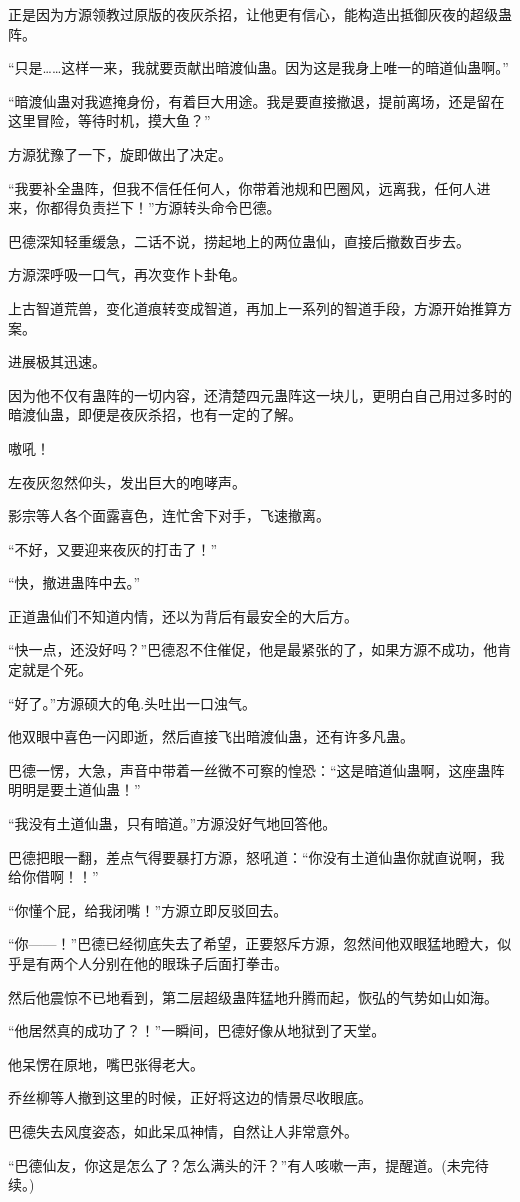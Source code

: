 \begin{this_body}
正是因为方源领教过原版的夜灰杀招，让他更有信心，能构造出抵御灰夜的超级蛊阵。

“只是……这样一来，我就要贡献出暗渡仙蛊。因为这是我身上唯一的暗道仙蛊啊。”

“暗渡仙蛊对我遮掩身份，有着巨大用途。我是要直接撤退，提前离场，还是留在这里冒险，等待时机，摸大鱼？”

方源犹豫了一下，旋即做出了决定。

“我要补全蛊阵，但我不信任任何人，你带着池规和巴圈风，远离我，任何人进来，你都得负责拦下！”方源转头命令巴德。

巴德深知轻重缓急，二话不说，捞起地上的两位蛊仙，直接后撤数百步去。

方源深呼吸一口气，再次变作卜卦龟。

上古智道荒兽，变化道痕转变成智道，再加上一系列的智道手段，方源开始推算方案。

进展极其迅速。

因为他不仅有蛊阵的一切内容，还清楚四元蛊阵这一块儿，更明白自己用过多时的暗渡仙蛊，即便是夜灰杀招，也有一定的了解。

嗷吼！

左夜灰忽然仰头，发出巨大的咆哮声。

影宗等人各个面露喜色，连忙舍下对手，飞速撤离。

“不好，又要迎来夜灰的打击了！”

“快，撤进蛊阵中去。”

正道蛊仙们不知道内情，还以为背后有最安全的大后方。

“快一点，还没好吗？”巴德忍不住催促，他是最紧张的了，如果方源不成功，他肯定就是个死。

“好了。”方源硕大的龟.头吐出一口浊气。

他双眼中喜色一闪即逝，然后直接飞出暗渡仙蛊，还有许多凡蛊。

巴德一愣，大急，声音中带着一丝微不可察的惶恐：“这是暗道仙蛊啊，这座蛊阵明明是要土道仙蛊！”

“我没有土道仙蛊，只有暗道。”方源没好气地回答他。

巴德把眼一翻，差点气得要暴打方源，怒吼道：“你没有土道仙蛊你就直说啊，我给你借啊！！”

“你懂个屁，给我闭嘴！”方源立即反驳回去。

“你——！”巴德已经彻底失去了希望，正要怒斥方源，忽然间他双眼猛地瞪大，似乎是有两个人分别在他的眼珠子后面打拳击。

然后他震惊不已地看到，第二层超级蛊阵猛地升腾而起，恢弘的气势如山如海。

“他居然真的成功了？！”一瞬间，巴德好像从地狱到了天堂。

他呆愣在原地，嘴巴张得老大。

乔丝柳等人撤到这里的时候，正好将这边的情景尽收眼底。

巴德失去风度姿态，如此呆瓜神情，自然让人非常意外。

“巴德仙友，你这是怎么了？怎么满头的汗？”有人咳嗽一声，提醒道。(未完待续。)

\end{this_body}

